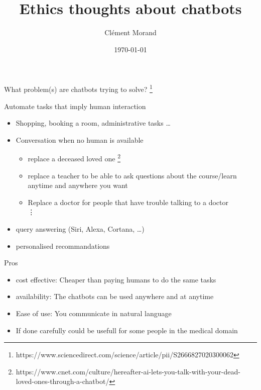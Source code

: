 \documentclass[11pt, aspectratio=169,]{beamer}
\title{Ethics thoughts about chatbots}
\author{Clément Morand}
\date{\today}
\begin{document}
\begin{frame}
	\titlepage
\end{frame}


\begin{frame}{What problem(s) are chatbots trying to solve? \footnote{https://www.sciencedirect.com/science/article/pii/S2666827020300062}}
\begin{block}{Automate tasks that imply human interaction}
    \begin{itemize}
        \item Shopping, booking a room, administrative tasks \dots
        \item Conversation when no human is available
            \begin{itemize}
                \item replace a deceased loved one \footnote{https://www.cnet.com/culture/hereafter-ai-lets-you-talk-with-your-dead-loved-ones-through-a-chatbot/}
                \item replace a teacher to be able to ask questions about the course/learn anytime and anywhere you want
                \item Replace a doctor for people that have trouble
                  talking to a doctor \\
                \center \vdots
            \end{itemize}
        \item query answering (Siri, Alexa, Cortana, \dots)
        \item personalised recommandations
    \end{itemize}
\end{block}

\end{frame}

\begin{frame}{Pros}
    \begin{itemize}
        \item cost effective: Cheaper than paying humans to do the same tasks
        \item availability: The chatbots can be used anywhere and at anytime
        \item Ease of use: You communicate in natural language
        \item If done carefully could be usefull for some people in the medical domain
    \end{itemize}
\end{frame}
\end{document}
